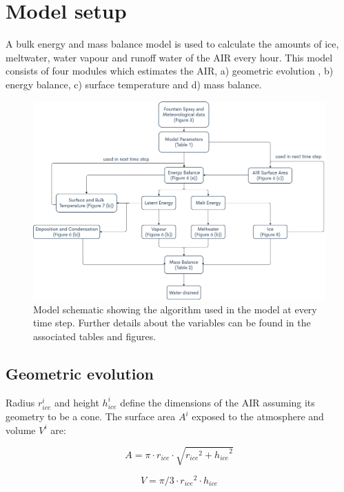 \documentclass[utf8]{frontiersSCNS} %
\begin{document}
\section{Model setup}

A bulk energy and mass balance model is used to calculate the amounts of ice, meltwater, water vapour and runoff water
of the AIR every hour. This model consists of four modules which estimates the AIR, a) geometric evolution , b) energy
balance, c) surface temperature and d) mass balance. 

  \begin{figure} \begin{center} \includegraphics[width=15 cm]{Figures/Figure_4.jpg} \end{center} \caption{Model
schematic showing the algorithm used in the model at every time step. Further details about the variables can be
found in the associated tables and figures.} \label{fig:schema} \end{figure}

\subsection{Geometric evolution}

Radius $r_{ice}^i$ and height $h_{ice}^i$ define the dimensions of the AIR assuming its geometry to be a cone. The
surface area $A^i$ exposed to the atmosphere and volume $V^i$ are:

\begin{equation} A = \pi \cdot r_{ice} \cdot \sqrt{{r_{ice}}^2 + {h_{ice}}^ 2} \label{eqn:A} \end{equation}

\begin{equation} V = \pi/3 \cdot {r_{ice}}^2 \cdot h_{ice} \label{eqn:V} \end{equation}
\end{document}
